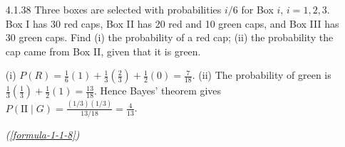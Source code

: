 \begin{enumerate}[label={},font=\normalfont,leftmargin=1.15cm,labelwidth=1.0cm,labelsep=0.15cm,itemindent=0pt,listparindent=0pt,itemsep=\baselineskip,parsep=0pt,topsep=0pt]
The equations give
\begin{equation*}
A=\begin{bmatrix}1&1&-1\\2&3&1\\-3&1&7\end{bmatrix},\quad
X=\begin{bmatrix}l\\b\\h\end{bmatrix},\quad
B=\begin{bmatrix}3\\10\\-1\end{bmatrix}.
\tag*{(\ref{formula-1-1-1})}\end{equation*}
$\det A=-8\ne0$, so $A^{-1}$ exists. Solving gives $(l,b,h)=(3,1,1)$ cm. For part (a),
\[
A^{-1}=\begin{bmatrix}-5/2&1&-1/2\\17/8&-1/2&3/8\\-11/8&1/2&-1/8\end{bmatrix};
\]
for part (b),
\[
A^2+7I=\begin{bmatrix}13&3&-7\\5&19&8\\-22&7&60\end{bmatrix}.
\]
The Python code computes the dimensions, determinant, inverse and alternative matrix expression.
\begin{lstlisting}[frame=single, basicstyle=\rmfamily, escapeinside={(*@}{@*)}]
(*@\makebox[\dimexpr\linewidth-2\fboxsep-2\fboxrule\relax][c]{codes/4.1.37.py}@*)
\end{lstlisting}

\item[4.1.38] Three boxes are selected with probabilities $i/6$ for Box $i$, $i=1,2,3$. Box I has 30 red caps, Box II has 20 red and 10 green caps, and Box III has 30 green caps. Find (i) the probability of a red cap; (ii) the probability the cap came from Box II, given that it is green.

\vspace{0.6em}\par\solution


(i) $P(R)=\frac16(1)+\frac13(\frac23)+\frac12(0)=\boxed{\frac7{18}}$. (ii) The probability of green is $\frac13(\frac13)+\frac12(1)=\frac{13}{18}$. Hence Bayes' theorem gives $P(\text{II}\mid G)=\frac{(1/3)(1/3)}{13/18}=\boxed{\frac4{13}}$.
\par\noindent\hfill\mbox{\textit{(\ref{formula-1-1-8})}}\par\end{enumerate}